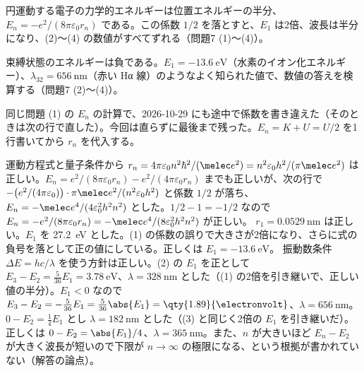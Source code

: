 \begin{daiji}
  \item 円運動する電子の力学的エネルギーは位置エネルギーの半分、$E_{n}=-e^{2}/(8\pi\varepsilon_{0}r_{n})$ である。この係数 $1/2$ を落とすと、$E_{1}$ は2倍、波長は半分になり、(2)〜(4) の数値がすべてずれる（問題7 (1)〜(4)）。
  \item 束縛状態のエネルギーは負である。$E_{1}=\qty{-13.6}{\electronvolt}$（水素のイオン化エネルギー）、$\lambda_{32}=\qty{656}{\nano\metre}$（赤い Hα 線）のようなよく知られた値で、数値の答えを検算する（問題7 (2)〜(4)）。
\end{daiji}
\begin{maemo}
  \item 同じ問題 (1) の $E_{n}$ の計算で、2026-10-29 にも途中で係数を書き違えた（そのときは次の行で直した）。今回は直らずに最後まで残った。$E_{n}=K+U=U/2$ を1行書いてから $r_{n}$ を代入する。
\end{maemo}
\begin{kotaeran}
   運動方程式と量子条件から $r_{n}=4\pi\varepsilon_{0}n^{2}\hbar^{2}/(\melec e^{2})=n^{2}\varepsilon_{0}h^{2}/(\pi\melec e^{2})$ は正しい。$E_{n}=e^{2}/(8\pi\varepsilon_{0}r_{n})-e^{2}/(4\pi\varepsilon_{0}r_{n})$ までも正しいが、次の行で $-\bigl(e^{2}/(4\pi\varepsilon_{0})\bigr)\cdot\pi\melec e^{2}/(n^{2}\varepsilon_{0}h^{2})$ と係数 $1/2$ が落ち、$E_{n}=-\melec e^{4}/(4\varepsilon_{0}^{2}h^{2}n^{2})$ とした。$1/2-1=-1/2$ なので $E_{n}=-e^{2}/(8\pi\varepsilon_{0}r_{n})=-\melec e^{4}/(8\varepsilon_{0}^{2}h^{2}n^{2})$ が正しい。
   $r_{1}=\qty{0.0529}{\nano\metre}$ は正しい。$E_{1}$ を \qty{27.2}{\electronvolt} とした。(1) の係数の誤りで大きさが2倍になり、さらに式の負号を落として正の値にしている。正しくは $E_{1}=\qty{-13.6}{\electronvolt}$。
   振動数条件 $\Delta E=hc/\lambda$ を使う方針は正しい。(2) の $E_{1}$ を正として $E_{3}-E_{2}=\frac{5}{36}E_{1}=\qty{3.78}{\electronvolt}$、$\lambda=\qty{328}{\nano\metre}$ とした（(1) の2倍を引き継いで、正しい値の半分）。$E_{1}<0$ なので $E_{3}-E_{2}=-\frac{5}{36}E_{1}=\frac{5}{36}\abs{E_{1}}=\qty{1.89}{\electronvolt}$、$\lambda=\qty{656}{\nano\metre}$。
   $0-E_{2}=\frac{1}{4}E_{1}$ とし $\lambda=\qty{182}{\nano\metre}$ とした（(3) と同じく2倍の $E_{1}$ を引き継いだ）。正しくは $0-E_{2}=\abs{E_{1}}/4$、$\lambda=\qty{365}{\nano\metre}$。また、$n$ が大きいほど $E_{n}-E_{2}$ が大きく波長が短いので下限が $n\to\infty$ の極限になる、という根拠が書かれていない（解答の論点）。
\end{kotaeran}
